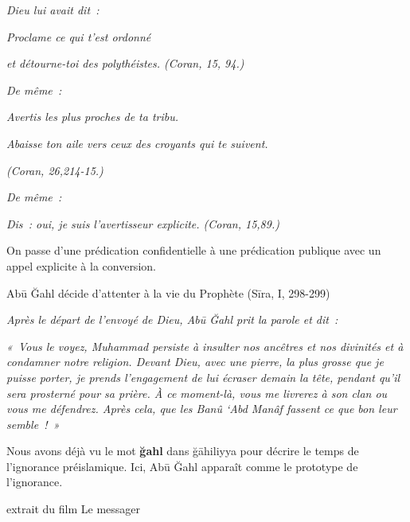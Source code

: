 \emph{Dieu lui avait dit~:}

\emph{Proclame ce qui t'est ordonné}

\emph{et détourne-toi des polythéistes. (Coran, 15, 94.)}

\emph{De même~:}

\emph{Avertis les plus proches de ta tribu.}

\emph{Abaisse ton aile vers ceux des croyants qui te suivent.}

\emph{(Coran, 26,214-15.)}

\emph{De même~:}

\emph{Dis~: oui, je suis l'avertisseur explicite. (Coran, 15,89.)}

On passe d'une prédication confidentielle à une prédication publique
avec un appel explicite à la conversion.


Abū Ğahl décide d'attenter à la vie du Prophète (Sīra, I, 298-299)

\emph{Après le départ de l'envoyé de Dieu, Abū Ğahl prit la parole et
dit~:}

\emph{«~Vous le voyez, Muhammad persiste à insulter nos ancêtres et nos
divinités et à condamner notre religion. Devant Dieu, avec une pierre,
la plus grosse que je puisse porter, je prends l'engagement de lui
écraser demain la tête, pendant qu'il sera prosterné pour sa prière. À
ce moment-là, vous me livrerez à son clan ou vous me défendrez. Après
cela, que les Banû `Abd Manâf fassent ce que bon leur semble~!~»}

Nous avons déjà vu le mot \textbf{ğahl} dans ğāhiliyya pour décrire le
temps de l'ignorance préislamique. Ici, Abū Ğahl apparaît comme le
prototype de l'ignorance.


extrait du film Le messager


